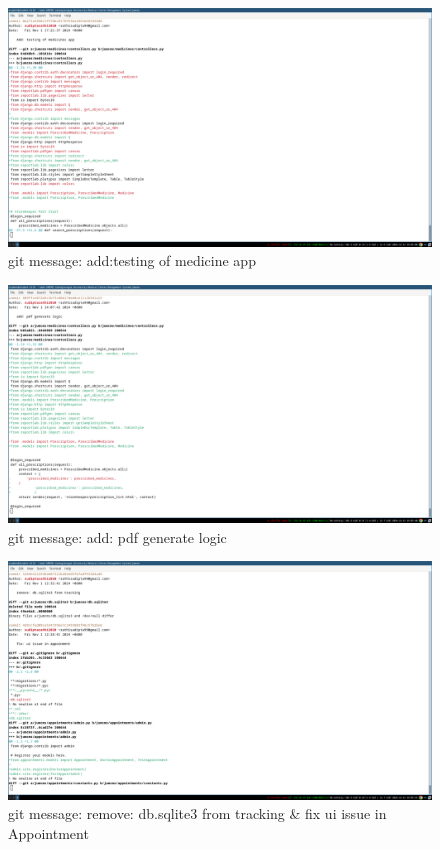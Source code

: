 \documentclass[a4paper,12pt]{article}
\begin{document}
\begin{figure}[H]
    \centering
    \includegraphics[width=\textwidth]{spr1meet33.png}
    \caption{git message: add:testing of medicine app}
\end{figure}


\begin{figure}[H]
    \centering
    \includegraphics[width=\textwidth]{spr1meet34.png}
    \caption{git message: add: pdf generate logic}
\end{figure}


\begin{figure}[H]
    \centering
    \includegraphics[width=\textwidth]{spr1meet35.png}
    \caption{git message: remove: db.sqlite3 from tracking \& fix ui issue in Appointment}
\end{figure}
\end{document}
